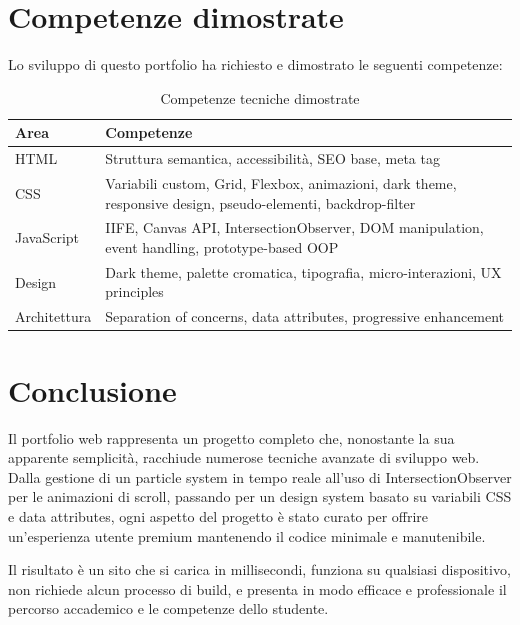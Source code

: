 \documentclass[a4paper,12pt]{report}
\begin{document}
\section{Competenze dimostrate}

Lo sviluppo di questo portfolio ha richiesto e dimostrato le seguenti competenze:

\begin{table}[H]
\centering
\caption{Competenze tecniche dimostrate}
\begin{tabularx}{\textwidth}{l X}
\toprule
\textbf{Area} & \textbf{Competenze} \\
\midrule
HTML & Struttura semantica, accessibilit\`a, SEO base, meta tag \\
CSS & Variabili custom, Grid, Flexbox, animazioni, dark theme, responsive design, pseudo-elementi, backdrop-filter \\
JavaScript & IIFE, Canvas API, IntersectionObserver, DOM manipulation, event handling, prototype-based OOP \\
Design & Dark theme, palette cromatica, tipografia, micro-interazioni, UX principles \\
Architettura & Separation of concerns, data attributes, progressive enhancement \\
\bottomrule
\end{tabularx}
\end{table}

\section{Conclusione}

Il portfolio web rappresenta un progetto completo che, nonostante la sua apparente semplicit\`a, racchiude numerose tecniche avanzate di sviluppo web. Dalla gestione di un particle system in tempo reale all'uso di IntersectionObserver per le animazioni di scroll, passando per un design system basato su variabili CSS e data attributes, ogni aspetto del progetto \`e stato curato per offrire un'esperienza utente premium mantenendo il codice minimale e manutenibile.

Il risultato \`e un sito che si carica in millisecondi, funziona su qualsiasi dispositivo, non richiede alcun processo di build, e presenta in modo efficace e professionale il percorso accademico e le competenze dello studente.
\end{document}
